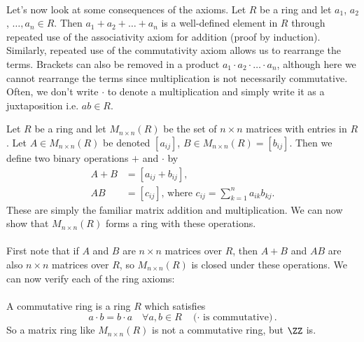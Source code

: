 \documentclass[../abstract_algebra.tex]{subfiles}
\begin{document}
        \paragraph{}
        Let's now look at some consequences of the axioms. Let $R$ be a ring and let $a_1$, $a_2$, $\dots,a_n\in R$.
        Then $a_1+a_2+\dots+a_n$ is a well-defined element in $R$ through repeated use of the associativity axiom for addition (proof by induction).
        Similarly, repeated use of the commutativity axiom allows us to rearrange the terms.
        Brackets can also be removed in a product $a_1\cdot a_2\cdot\dots\cdot a_n$, although here we cannot rearrange the terms since multiplication is not necessarily commutative.
        Often, we don't write $\cdot$ to denote a multiplication and simply write it as a juxtaposition i.e. $ab\in R$.

        \begin{example}
            Let $R$ be a ring and let $M_{n\times n}(R)$ be the set of $n\times n$ matrices with entries in $R$.
            Let $A\in M_{n\times n}(R)$ be denoted $[a_{ij}]$, $B\in M_{n\times n}(R)=[b_{ij}]$.
            Then we define two binary operations $+$ and $\cdot$ by
            \begin{align}
                A+B&=[a_{ij}+b_{ij}],\\
                AB&=[c_{ij}]\text{, where } c_{ij}=\sum_{k=1}^{n}a_{ik}b_{kj}.
            \end{align}
            These are simply the familiar matrix addition and multiplication.
            We can now show that $M_{n\times n}(R)$ forms a ring with these operations.
            
            \paragraph{}
            First note that if $A$ and $B$ are $n\times n$ matrices over $R$, then $A+B$ and $AB$ are also $n\times n$ matrices over $R$, so $M_{n\times n}(R)$ is closed under these operations.
            We can now verify each of the ring axioms:
        \end{example}

        \paragraph{}
        A commutative ring is a ring $R$ which satisfies
        \begin{equation}
            a\cdot b=b\cdot a\quad\forall a,b\in R\quad\text{($\cdot$ is commutative)}.
        \end{equation}
        So a matrix ring like $M_{n\times n}(R)$ is not a commutative ring, but $\ZZ$ is.
\end{document}
